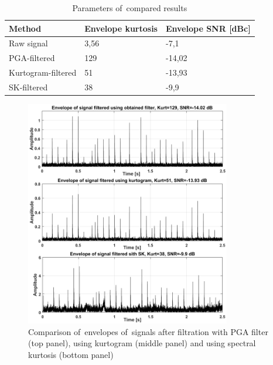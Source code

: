 
\begin{table}[ht!]
  \centering
  \caption{Parameters of~compared results}
 \begin{tabular}{|l|l|l|}
  \hline
  \textbf{Method} & \textbf{Envelope kurtosis} & \textbf{Envelope SNR [dBc]} \\ \hline
     Raw signal & 3,56 & -7,1 \\ \hline
     PGA-filtered & 129 & -14,02 \\ \hline
     Kurtogram-filtered & 51 & -13,93 \\ \hline
     SK-filtered & 38 & -9,9 \\
     
  \hline
  \end{tabular}
  \label{tab:tab4}
\end{table}


\begin{figure}[ht!]
\centering
\includegraphics[width=0.8\textwidth]{wykresy/comp.png}
\caption{Comparison of~envelopes of~signals after filtration with PGA filter (top panel), using kurtogram (middle panel) and using spectral kurtosis (bottom panel)}
\label{fig:comp}
\end{figure}




